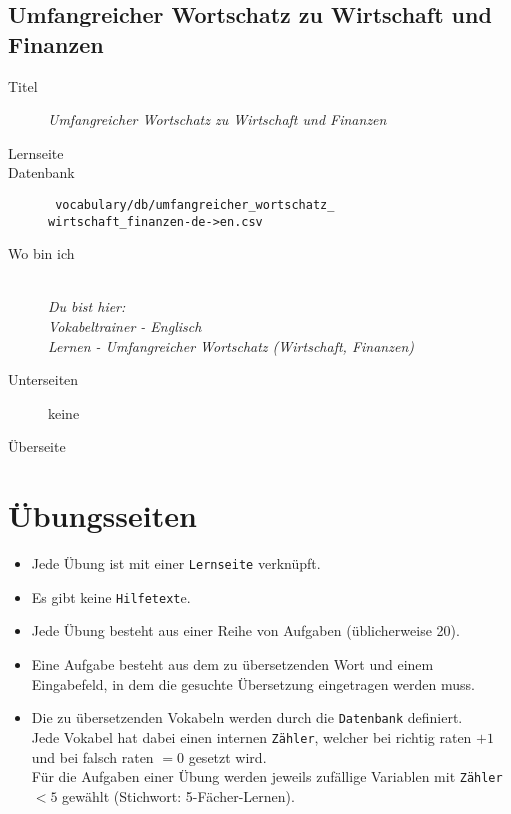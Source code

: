 \subsection{ Umfangreicher Wortschatz zu Wirtschaft und Finanzen }
\label{has:voc-learn-page5}
\begin{description}
	\item[Titel] \emph{ Umfangreicher Wortschatz zu Wirtschaft und Finanzen }
	\item[Lernseite] 
	\item[Datenbank] \texttt{ vocabulary/db/umfangreicher\_wortschatz\_\\wirtschaft\_finanzen-de->en.csv }
	\item[Wo bin ich] \emph{\\Du bist hier:\\Vokabeltrainer - Englisch\\Lernen - Umfangreicher Wortschatz (Wirtschaft, Finanzen)}
	\item[Unterseiten] keine
	\item[Überseite] 
\end{description}

\section{ Übungsseiten }
\label{has:voc-practice}

\begin{itemize}
	\item Jede Übung ist mit einer \texttt{Lernseite} verknüpft.
	\item Es gibt keine \texttt{Hilfetext}e.
	\item Jede Übung besteht aus einer Reihe von Aufgaben (üblicherweise 20).
	\item Eine Aufgabe besteht aus dem zu übersetzenden Wort und einem Eingabefeld, in dem die gesuchte Übersetzung eingetragen werden muss.
	\item Die zu übersetzenden Vokabeln werden durch die \texttt{Datenbank} definiert.\\
		Jede Vokabel hat dabei einen internen \texttt{Zähler}, welcher bei richtig raten $+1$ und bei falsch raten $=0$ gesetzt wird.\\
		Für die Aufgaben einer Übung werden jeweils zufällige Variablen mit \texttt{Zähler} $<5$ gewählt (Stichwort: 5-Fächer-Lernen).

\end{itemize}

